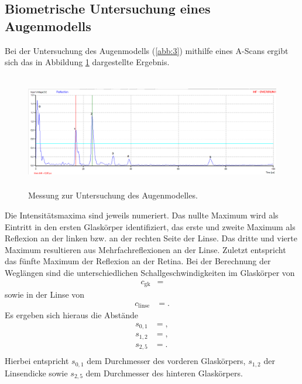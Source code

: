 \subsection{Biometrische Untersuchung eines Augenmodells}
Bei der Untersuchung des Augenmodells (\ref{abb:3}) mithilfe eines A-Scans ergibt sich das in Abbildung \ref{fig:messung_auge} dargestellte Ergebnis.
\begin{figure}
  \centering
  \includegraphics[height=5cm]{messdaten/auge_messung.png}
  \caption{Messung zur Untersuchung des Augenmodelles.}
  \label{fig:messung_auge}
\end{figure}
Die Intensitätsmaxima sind jeweils numeriert.
Das nullte Maximum wird als Eintritt in den ersten Glaskörper identifiziert, das erste und zweite Maximum als Reflexion an der linken bzw. an der rechten Seite der Linse.
Das dritte und vierte Maximum resultieren aus Mehrfachreflexionen an der Linse.
Zuletzt entspricht das fünfte Maximum der Reflexion an der Retina.
Bei der Berechnung der Weglängen sind die unterschiedlichen Schallgeschwindigkeiten im Glaskörper von
\begin{align*}
  c_\text{gk} &= 
\end{align*}
sowie in der Linse von
\begin{align*}
  c_\text{linse} &= .
\end{align*}
Es ergeben sich hieraus die Abstände
\begin{align*}
  s_{0,1} &= , \\
  s_{1,2} &= , \\
  s_{2,5} &= . \\
\end{align*}
Hierbei entspricht $s_{0,1}$ dem Durchmesser des vorderen Glaskörpers, $s_{1,2}$ der Linsendicke sowie $s_{2,5}$ dem Durchmesser des hinteren Glaskörpers.
